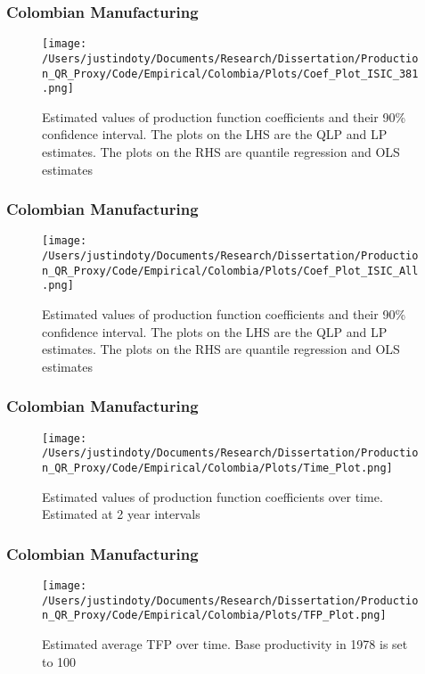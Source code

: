 \documentclass{beamer}
\begin{document}
\begin{frame}
\frametitle{Colombian Manufacturing}
\begin{figure}[ht]
\centering
\texttt{[image: /Users/justindoty/Documents/Research/Dissertation/Production\_QR\_Proxy/Code/Empirical/Colombia/Plots/Coef\_Plot\_ISIC\_381.png]}
\caption{Estimated values of production function coefficients and their 90\% confidence interval. The plots on the LHS are the QLP and LP estimates. The plots on the RHS are quantile regression and OLS estimates}
\end{figure}
\end{frame}

\begin{frame}
\frametitle{Colombian Manufacturing}
\begin{figure}[ht]
\centering
\texttt{[image: /Users/justindoty/Documents/Research/Dissertation/Production\_QR\_Proxy/Code/Empirical/Colombia/Plots/Coef\_Plot\_ISIC\_All.png]}
\caption{Estimated values of production function coefficients and their 90\% confidence interval. The plots on the LHS are the QLP and LP estimates. The plots on the RHS are quantile regression and OLS estimates}
\end{figure}
\end{frame}

\begin{frame}
\frametitle{Colombian Manufacturing}
\begin{figure}[ht]
\centering
\texttt{[image: /Users/justindoty/Documents/Research/Dissertation/Production\_QR\_Proxy/Code/Empirical/Colombia/Plots/Time\_Plot.png]}
\caption{Estimated values of production function coefficients over time. Estimated at 2 year intervals}
\end{figure}
\end{frame}

\begin{frame}
\frametitle{Colombian Manufacturing}
\begin{figure}[ht]
\centering
\texttt{[image: /Users/justindoty/Documents/Research/Dissertation/Production\_QR\_Proxy/Code/Empirical/Colombia/Plots/TFP\_Plot.png]}
\caption{Estimated average TFP over time. Base productivity in 1978 is set to 100}
\end{figure}
\end{frame}
\end{document}
